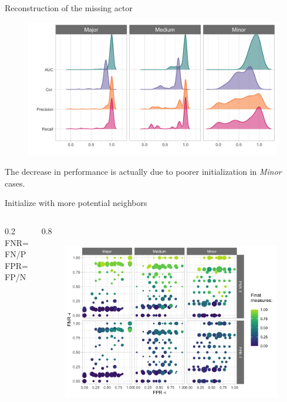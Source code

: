 \documentclass[11pt]{beamer}
\begin{document}
 \begin{frame}{Reconstruction of the missing actor}
  \begin{figure}
 \includegraphics[width=0.9\linewidth]{images/simu_densities.png}
 \end{figure}
 The decrease in performance is actually due to poorer initialization in \textit{Minor} cases.
 \end{frame}
  \begin{frame}{Initialize with more potential neighbors}
  \begin{columns}
   \begin{column} {0.2\linewidth}
   FNR= FN/P\\
   FPR=FP/N
     \end{column}
        \begin{column} {0.8\linewidth}
          \begin{figure}
 \includegraphics[width=\linewidth]{images/quali_init_spca.png}
 \end{figure}
     \end{column}
  \end{columns}

 \end{frame}
 
\end{document}

